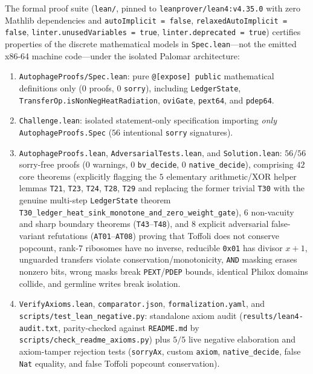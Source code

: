 \documentclass[11pt,reqno]{amsart}
\theoremstyle{plain}
\theoremstyle{definition}
\theoremstyle{remark}
\newcommand{\code}[1]{{\footnotesize\nolinkurl{#1}}}
\begin{document}
The formal proof suite (\code{lean/}, pinned to \code{leanprover/lean4:v4.35.0} with zero Mathlib dependencies and \code{autoImplicit = false}, \code{relaxedAutoImplicit = false}, \code{linter.unusedVariables = true}, \code{linter.deprecated = true}) certifies properties of the discrete mathematical models in \code{Spec.lean}---not the emitted x86-64 machine code---under the isolated Palomar architecture:
\begin{enumerate}[leftmargin=1.5em,itemsep=2pt]
  \item \code{AutophageProofs/Spec.lean}: pure \code{@[expose] public} mathematical definitions only ($0$ proofs, $0$ \code{sorry}), including \code{LedgerState}, \code{TransferOp.isNonNegHeatRadiation}, \code{oviGate}, \code{pext64}, and \code{pdep64}.
  \item \code{Challenge.lean}: isolated statement-only specification importing \emph{only} \code{AutophageProofs.Spec} ($56$ intentional \code{sorry} signatures).
  \item \code{AutophageProofs.lean}, \code{AdversarialTests.lean}, and \code{Solution.lean}: $56/56$ sorry-free proofs ($0$ warnings, $0$ \code{bv_decide}, $0$ \code{native_decide}), comprising $42$ core theorems (explicitly flagging the $5$ elementary arithmetic/XOR helper lemmas \code{T21}, \code{T23}, \code{T24}, \code{T28}, \code{T29} and replacing the former trivial \code{T30} with the genuine multi-step \code{LedgerState} theorem \code{T30_ledger_heat_sink_monotone_and_zero_weight_gate}), $6$ non-vacuity and sharp boundary theorems (\code{T43}--\code{T48}), and $8$ explicit adversarial false-variant refutations (\code{AT01}--\code{AT08}) proving that Toffoli does not conserve popcount, rank-$7$ ribosomes have no inverse, reducible \code{0x01} has divisor $x+1$, unguarded transfers violate conservation/monotonicity, \code{AND} masking erases nonzero bits, wrong masks break \code{PEXT}/\code{PDEP} bounds, identical Philox domains collide, and germline writes break isolation.
  \item \code{VerifyAxioms.lean}, \code{comparator.json}, \code{formalization.yaml}, and \code{scripts/test_lean_negative.py}: standalone axiom audit (\code{results/lean4-audit.txt}, parity-checked against \code{README.md} by \code{scripts/check_readme_axioms.py}) plus $5/5$ live negative elaboration and axiom-tamper rejection tests (\code{sorryAx}, custom \code{axiom}, \code{native_decide}, false \code{Nat} equality, and false Toffoli popcount conservation).
\end{enumerate}
\end{document}
